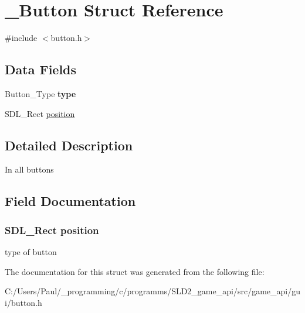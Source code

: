 \hypertarget{struct___button}{\section{\+\_\+\+Button Struct Reference}
\label{struct___button}
}


{\ttfamily \#include $<$button.\+h$>$}

\subsection*{Data Fields}
\begin{DoxyCompactItemize}
\item 
\hypertarget{struct___button_add357a13bd005a199cb60dfdb83401b7}{Button\+\_\+\+Type {\bfseries type}}\label{struct___button_add357a13bd005a199cb60dfdb83401b7}

\item 
S\+D\+L\+\_\+\+Rect \hyperlink{struct___button_ac06cf6a292dc0e70e28b394fa481aef2}{position}
\end{DoxyCompactItemize}


\subsection{Detailed Description}
In all buttons 

\subsection{Field Documentation}
\hypertarget{struct___button_ac06cf6a292dc0e70e28b394fa481aef2}{
\subsubsection[{position}]{\setlength{\rightskip}{0pt plus 5cm}S\+D\+L\+\_\+\+Rect position}}\label{struct___button_ac06cf6a292dc0e70e28b394fa481aef2}
type of button 

The documentation for this struct was generated from the following file\+:\begin{DoxyCompactItemize}
\item 
C\+:/\+Users/\+Paul/\+\_\+programming/c/programms/\+S\+L\+D2\+\_\+game\+\_\+api/src/game\+\_\+api/gui/button.\+h\end{DoxyCompactItemize}
